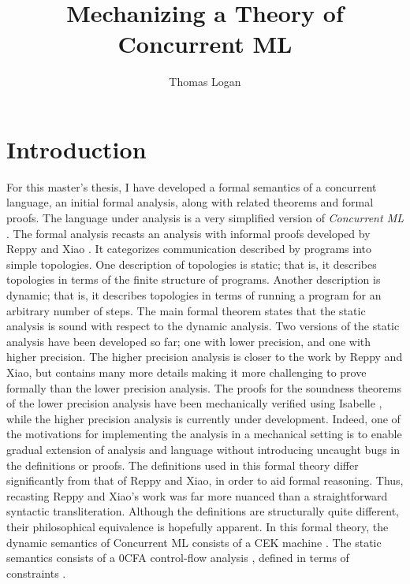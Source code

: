 \documentclass[letterpaper, 11pt]{extarticle}
\title{Mechanizing a Theory of Concurrent ML}
\author{Thomas Logan}
\begin{document}
\maketitle
{}

\newpage
{}

\section{Introduction}
For this master's thesis, I have developed a formal semantics of
a concurrent language, an initial formal analysis, along with related theorems and formal 
proofs. The language under analysis is
a very simplified version of \textit{Concurrent ML} \cite{reppy2007concurrent}. The formal analysis
recasts an analysis with informal proofs developed by Reppy and Xiao \cite{reppy2007specialization}. It
categorizes communication described by programs into simple topologies. One description of
topologies is static; that is, it describes topologies in terms of the finite structure of
programs.  Another description is dynamic; that is, it describes topologies in terms of running
a program for an arbitrary number of steps. The main formal theorem states that the static
analysis is sound with respect to the dynamic analysis. Two versions of the static analysis
have been developed so far; one with lower precision, and one with higher precision. The higher
precision analysis is closer to the work by Reppy and Xiao, but contains many more details making
it more challenging to prove formally than the lower precision analysis.
The proofs for the soundness theorems of the lower precision analysis
have been mechanically verified using Isabelle \cite{nipkow2002isabelle}, while the higher precision
analysis is currently under development. Indeed, one of the motivations for implementing the analysis 
in a mechanical setting is to enable gradual extension of analysis and language without introducing
uncaught bugs in the definitions or proofs. The definitions used in this formal theory differ
significantly from that of Reppy and Xiao, in order to aid formal reasoning. Thus, recasting
Reppy and Xiao's work was far more nuanced than a straightforward
syntactic transliteration.
Although the definitions are structurally quite different,
their philosophical equivalence is hopefully apparent. 
In this formal theory, the dynamic semantics of Concurrent ML consists of 
a CEK machine \cite{felleisen1986control}. The static semantics consists of a 0CFA control-flow analysis
\cite{shivers1991control}, defined in terms of constraints \cite{nielson2015principles}.
\end{document}
